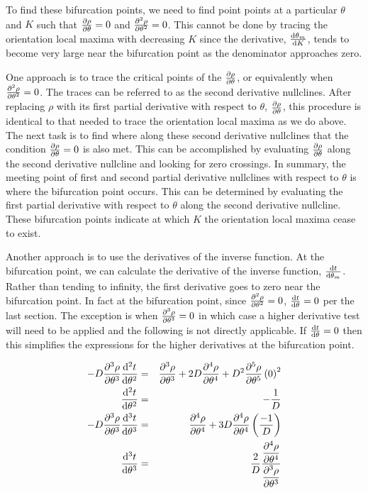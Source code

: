 \documentclass[11pt]{article} %
\begin{document}
To find these bifurcation points, we need to find point points at a particular $ \theta $ and $ K $ such that $ \pdv{\rho}{\theta} = 0 $ and $ \pdv[2]{\rho}{\theta} = 0 $. This cannot be done by tracing the orientation local maxima with decreasing $ K $ since the derivative, $ \dv{\theta_m}{K} $, tends to become very large near the bifurcation point as the denominator approaches zero.

One approach is to trace the critical points of the $ \pdv{\rho}{\theta} $, or equivalently when $ \pdv[2]{\rho}{\theta} = 0 $. The traces can be referred to as the second derivative nullclines. After replacing $ \rho $ with its first partial derivative with respect to $ \theta $, $ \pdv{\rho}{\theta} $, this procedure is identical to that needed to trace the orientation local maxima as we do above. The next task is to find where along these second derivative nullclines that the condition $ \pdv{\rho}{\theta} = 0 $ is also met. This can be accomplished by evaluating $ \pdv{\rho}{\theta} $ along the second derivative nullcline and looking for zero crossings. In summary, the meeting point of first and second partial derivative nullclines with respect to $ \theta $ is where the bifurcation point occurs. This can be determined by evaluating the first partial derivative with respect to $ \theta $ along the second derivative nullcline. These bifurcation points indicate at which $ K $ the orientation local maxima cease to exist.

Another approach is to use the derivatives of the inverse function. At the bifurcation point, we can calculate the derivative of the inverse function, $ \dv{t}{\theta_m} $. Rather than tending to infinity, the first derivative goes to zero near the bifurcation point. In fact at the bifurcation point, since $ \pdv[2]{\rho}{\theta}  = 0 $, $ \dv{t}{\theta}  = 0 $ per the last section.    The exception is when $ \pdv[3]{\rho}{\theta}  = 0 $ in which case a higher derivative test will need to be applied and the following is not directly applicable. If  $ \dv{t}{\theta}  = 0 $ then this simplifies the expressions for the higher derivatives at the bifurcation point.

\begin{eqnarray}
	-D \pdv[3]{\rho}{\theta} \dv[2]{t}{\theta} & = & \pdv[3]{\rho}{\theta} + 2 D \pdv[4]{\rho}{\theta} (0)  + D^2 \pdv[5]{\rho}{\theta} \left( 0 \right)^2 \\
	\dv[2]{t}{\theta} & = & -\frac{1}{D} \\
	-D \pdv[3]{\rho}{\theta} \dv[3]{t}{\theta} & = & \pdv[4]{\rho}{\theta}  + 3 D \pdv[4]{\rho}{\theta} \left( \frac{-1}{D} \right) \\
	\dv[3]{t}{\theta} & = & \frac{2}{D} \frac{\displaystyle \pdv[4]{\rho}{\theta}}{\displaystyle \pdv[3]{\rho}{\theta} }
\end{eqnarray}
\end{document}
